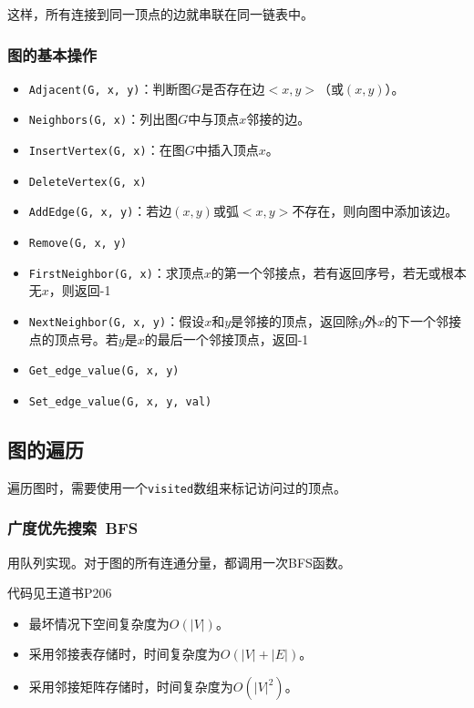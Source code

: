 \documentclass[12pt, a4paper, oneside]{ctexart}
\begin{document}
这样，所有连接到同一顶点的边就串联在同一链表中。

\subsubsection{图的基本操作}

\begin{itemize}
  \item \verb|Adjacent(G, x, y)|：判断图$G$是否存在边$<x, y>$（或$(x, y)$）。
  \item \verb|Neighbors(G, x)|：列出图$G$中与顶点$x$邻接的边。
  \item \verb|InsertVertex(G, x)|：在图$G$中插入顶点$x$。
  \item \verb|DeleteVertex(G, x)|
  \item \verb|AddEdge(G, x, y)|：若边$(x, y)$或弧$<x, y>$不存在，则向图中添加该边。
  \item \verb|Remove(G, x, y)|
  \item \verb|FirstNeighbor(G, x)|：求顶点$x$的第一个邻接点，若有返回序号，若无或根本无$x$，则返回-1
  \item \verb|NextNeighbor(G, x, y)|：假设$x$和$y$是邻接的顶点，返回除$y$外$x$的下一个邻接点的顶点号。若$y$是$x$的最后一个邻接顶点，返回-1
  \item \verb|Get_edge_value(G, x, y)|
  \item \verb|Set_edge_value(G, x, y, val)|
\end{itemize}

\subsection{图的遍历}

遍历图时，需要使用一个\verb|visited|数组来标记访问过的顶点。

\subsubsection{广度优先搜索\ BFS}

用队列实现。对于图的所有连通分量，都调用一次BFS函数。

代码见王道书P206

\begin{itemize}
  \item 最坏情况下空间复杂度为$O(\lvert V\rvert)$。
  \item 采用邻接表存储时，时间复杂度为$O(\lvert V\rvert +\lvert E\rvert)$。
  \item 采用邻接矩阵存储时，时间复杂度为$O(\lvert V\rvert ^2)$。
\end{itemize}
\end{document}
